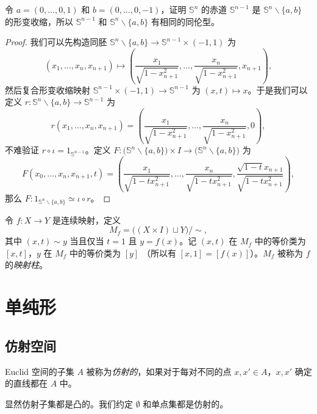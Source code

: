 \documentclass[fontset=none]{Notes}
\begin{document}
\begin{problem}{}{}
  令 $a=(0,\dots,0,1)$ 和 $b=(0,\dots,0,-1)$，证明 
  $\mathbb{S}^n$ 的赤道 $\mathbb{S}^{n-1}$ 是 $\mathbb{S}^n \smallsetminus\{a,b\}$
  的形变收缩，所以 $\mathbb{S}^{n-1}$ 和 $\mathbb{S}^n \smallsetminus\{a,b\}$
  有相同的同伦型。
\end{problem}
\begin{proof}
  我们可以先构造同胚 $\mathbb{S}^n \smallsetminus\{a,b\}\to \mathbb{S}^{n-1}\times (-1,1)$
  为
  \[
    (x_1,\dots,x_n,x_{n+1})\mapsto 
    \left(\frac{x_1}{\sqrt{1-x_{n+1}^2}},\dots,\frac{x_n}{\sqrt{1-x_{n+1}^2}},x_{n+1}\right),
  \]
  然后复合形变收缩映射 $\mathbb{S}^{n-1}\times (-1,1)\to \mathbb{S}^{n-1}$
  为 $(x,t)\mapsto x$。于是我们可以定义 $r: \mathbb{S}^n \smallsetminus\{a,b\}\to \mathbb{S}^{n-1}$
  为
  \[
    r(x_1,\dots,x_n,x_{n+1})=
    \left(\frac{x_1}{\sqrt{1-x_{n+1}^2}},\dots,\frac{x_n}{\sqrt{1-x_{n+1}^2}},0\right),
  \]
  不难验证 $r\circ\iota=1_{\mathbb{S}^{n-1}}$。定义
  $F:\bigl(\mathbb{S}^n \smallsetminus\{a,b\}\bigr)\times I\to \bigl(\mathbb{S}^n \smallsetminus\{a,b\}\bigr)$
  为
  \[
    F(x_0,\dots,x_n,x_{n+1},t)=
    \left(\frac{x_1}{\sqrt{1-tx_{n+1}^2}},\dots,\frac{x_n}{\sqrt{1-tx_{n+1}^2}},\frac{\sqrt{1-t}x_{n+1}}{\sqrt{1-tx_{n+1}^2}}\right),
  \]
  那么 $F:1_{\mathbb{S}^n \smallsetminus\{a,b\}}\simeq \iota\circ r$。
\end{proof}

\begin{definition}
  令 $f:X\to Y$ 是连续映射，定义
  \[
    M_f=\bigl((X\times I)\sqcup Y\bigr)/\sim,
  \]
  其中 $(x,t)\sim y$ 当且仅当 $t=1$ 且 $y=f(x)$。记 $(x,t)$ 在 $M_f$
  中的等价类为 $[x,t]$，$y$ 在 $M_f$ 中的等价类为 $[y]$
  （所以有 $[x,1]=[f(x)]$）。$M_f$ 被称为 $f$ 的\emph{映射柱}。
\end{definition}


\chapter{单纯形}

\section{仿射空间}

\begin{definition}
  Euclid 空间的子集 $A$ 被称为\emph{仿射的}，如果对于每对不同的点
  $x,x'\in A$，$x,x'$ 确定的直线都在 $A$ 中。
\end{definition}

显然仿射子集都是凸的。我们约定 $\emptyset$ 和单点集都是仿射的。
\end{document}
